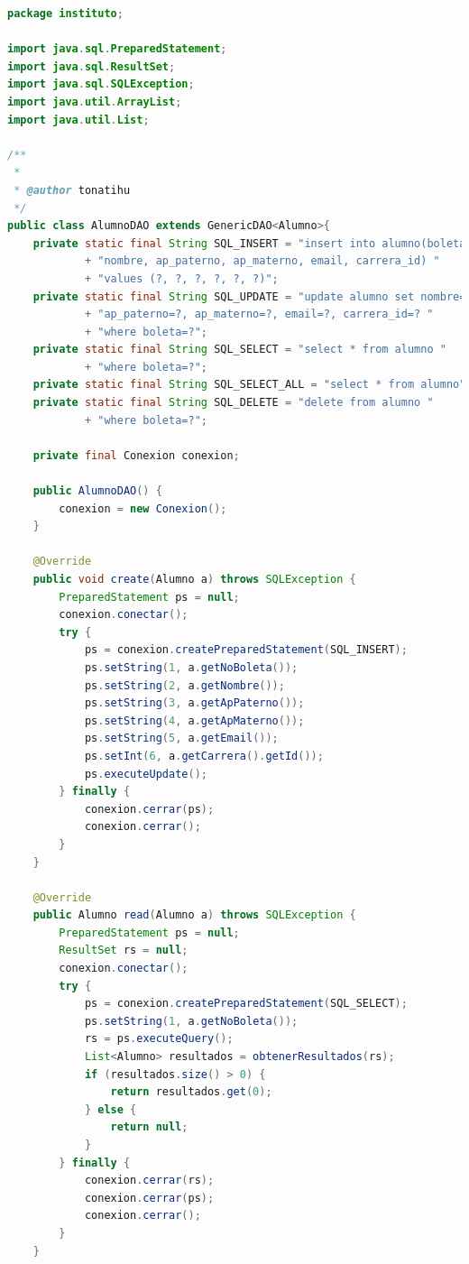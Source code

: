 \documentclass[a4paper,12pt]{article}
\begin{document}
\begin{lstlisting}[language=Java, style=customJava, 
caption={AlumnoDAO.java},captionpos=b,basicstyle=\fontfamily{cmss}\small]
package instituto;

import java.sql.PreparedStatement;
import java.sql.ResultSet;
import java.sql.SQLException;
import java.util.ArrayList;
import java.util.List;

/**
 *
 * @author tonatihu
 */
public class AlumnoDAO extends GenericDAO<Alumno>{
    private static final String SQL_INSERT = "insert into alumno(boleta, "
            + "nombre, ap_paterno, ap_materno, email, carrera_id) "
            + "values (?, ?, ?, ?, ?, ?)";
    private static final String SQL_UPDATE = "update alumno set nombre=?, "
            + "ap_paterno=?, ap_materno=?, email=?, carrera_id=? "
            + "where boleta=?";
    private static final String SQL_SELECT = "select * from alumno "
            + "where boleta=?";
    private static final String SQL_SELECT_ALL = "select * from alumno";
    private static final String SQL_DELETE = "delete from alumno "
            + "where boleta=?";

    private final Conexion conexion;

    public AlumnoDAO() {
        conexion = new Conexion();
    }

    @Override
    public void create(Alumno a) throws SQLException {
        PreparedStatement ps = null;
        conexion.conectar();
        try {
            ps = conexion.createPreparedStatement(SQL_INSERT);
            ps.setString(1, a.getNoBoleta());
            ps.setString(2, a.getNombre());
            ps.setString(3, a.getApPaterno());
            ps.setString(4, a.getApMaterno());
            ps.setString(5, a.getEmail());
            ps.setInt(6, a.getCarrera().getId());
            ps.executeUpdate();
        } finally {
            conexion.cerrar(ps);
            conexion.cerrar();
        }
    }

    @Override
    public Alumno read(Alumno a) throws SQLException {
        PreparedStatement ps = null;
        ResultSet rs = null;
        conexion.conectar();
        try {
            ps = conexion.createPreparedStatement(SQL_SELECT);
            ps.setString(1, a.getNoBoleta());
            rs = ps.executeQuery();
            List<Alumno> resultados = obtenerResultados(rs);
            if (resultados.size() > 0) {
                return resultados.get(0);
            } else {
                return null;
            }
        } finally {
            conexion.cerrar(rs);
            conexion.cerrar(ps);
            conexion.cerrar();
        }
    }


\end{lstlisting}
\end{document}
